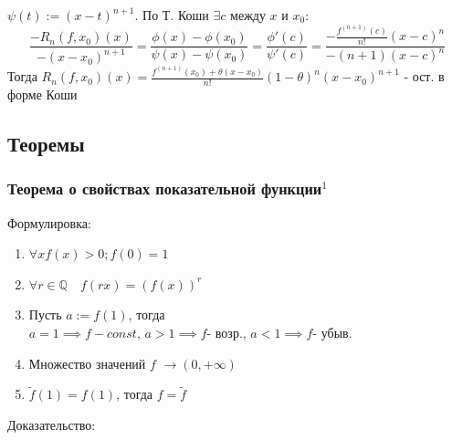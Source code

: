 \documentclass{article}
\begin{document}
$\psi(t) := (x-t)^{n+1}$. По Т. Коши $\exists c$ между $x$ и $x_0:$
$$
\frac{-R_n(f, x_0)(x)}{-(x-x_0)^{n+1}} = \frac{\phi(x)-\phi(x_0)}{\psi(x)-\psi(x_0)} = \frac{\phi'(c)}{\psi'(c)} = \frac{-\frac{f^{(n+1)} (c) }{n!} (x-c)^n}{-(n+1)(x-c)^n}
$$
Тогда $R_n(f, x_0)(x) = \frac{f^{(n+1)}(x_0)+\theta(x-x_0)}{n!} (1-\theta)^n(x-x_0)^{n+1}$ - ост. в форме Коши

\newpage

\subsection{Теоремы}

\subsubsection{Теорема о свойствах показательной функции\texorpdfstring{$^1$}{}}
Формулировка:
\begin{enumerate}
    \item $\forall x f(x) > 0; f(0) = 1$
    \item $\forall r \in \mathbb{Q} \quad f(rx) = (f(x))^r$
    \item Пусть $a:= f(1)$, тогда \\$a=1 \implies f-const$, $a > 1 \implies f \text{- возр.}$, $a < 1 \implies f \text{- убыв.}$
    \item Множество значений $f$ $\rightarrow (0, +\infty)$
    \item $\tilde f(1) = f(1)$, тогда $f = \tilde f$
\end{enumerate}
Доказательство:
\end{document}
